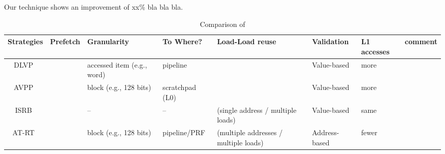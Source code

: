 \documentclass{sig-alternate}
\newcommand{\cmark}{\textcolor{ForestGreen}{\ding{51}}}%
\newcommand{\xmark}{\textcolor{red}{\ding{55}}}%
\begin{document}
Our technique shows an improvement of xx\% bla bla bla.



\begin{scriptsize}
\begin{table}[h!]
  \centering
  \begin{tabular}{|c|c|p{20mm}|p{20mm}|p{25mm}|p{20mm}|p{10mm}|p{20mm}|}
    \hline
    \textbf{Strategies} & 
    \textbf{Prefetch} & 
    \textbf{Granularity} & 
    \textbf{To Where?} &
    \textbf{Load-Load reuse} & 
    \textbf{Validation} & 
    \textbf{L1 accesses} & 
    \textbf{comment}\\
    \hline
    
    \hline
    DLVP~\cite{} &  \cmark & {\color{orange}accessed \newline item (e.g., word)} & pipeline & \xmark &  {\color{red} Value-based} &  {\color{red} more} &    \\
    \hline
    AVPP~\cite{} &  \cmark & {\color{green}block} \newline (e.g., 128 bits) & scratchpad \newline (L0)  & \xmark & {\color{red} Value-based} &  {\color{red} more} &   \\
    \hline
    ISRB~\cite{} &  \xmark & -- & -- & \cmark ({\color{orange}single address} / {\color{green}multiple loads}) & {\color{red} Value-based} &  {\color{black} same} &    \\
    \hline
    AT-RT~\cite{} &  \cmark & {\color{green}block} \newline (e.g., 128 bits)& pipeline/PRF & \cmark ({\color{green}multiple addresses} / {\color{green}multiple loads}) &  {\color{green} Address-based} & {\color{green} fewer} &    \\
    \hline

    
    \hline
  \end{tabular}
  \caption{Comparison of }
  \label{table:formatting}
\end{table}
\end{scriptsize}
\end{document}
